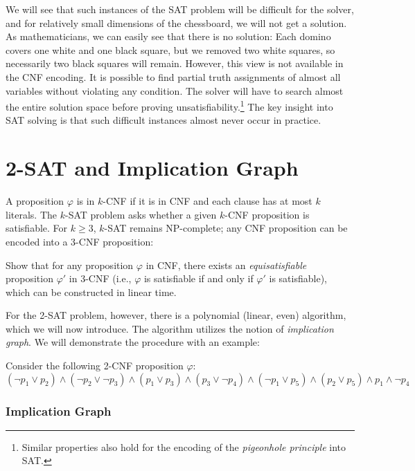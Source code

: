 We will see that such instances of the SAT problem will be difficult for the solver, and for relatively small dimensions of the chessboard, we will not get a solution. As mathematicians, we can easily see that there is no solution: Each domino covers one white and one black square, but we removed two white squares, so necessarily two black squares will remain. However, this view is not available in the CNF encoding. It is possible to find partial truth assignments of almost all variables without violating any condition. The solver will have to search almost the entire solution space before proving unsatisfiability.\footnote{Similar properties also hold for the encoding of the \emph{pigeonhole principle} into SAT.} The key insight into SAT solving is that such difficult instances almost never occur in practice.


\section{2-SAT and Implication Graph}

A proposition $\varphi$ is in $k$-CNF if it is in CNF and each clause has at most $k$ literals. The $k$-SAT problem asks whether a given $k$-CNF proposition is satisfiable. For $k \geq 3$, $k$-SAT remains NP-complete; any CNF proposition can be encoded into a 3-CNF proposition:

\begin{exercise}
Show that for any proposition $\varphi$ in CNF, there exists an \emph{equisatisfiable} proposition $\varphi'$ in 3-CNF (i.e., $\varphi$ is satisfiable if and only if $\varphi'$ is satisfiable), which can be constructed in linear time.
\end{exercise}

For the 2-SAT problem, however, there is a polynomial (linear, even) algorithm, which we will now introduce. The algorithm utilizes the notion of \emph{implication graph}. We will demonstrate the procedure with an example:
\begin{example}
    Consider the following 2-CNF proposition $\varphi$:
    $$
    (\neg p_1 \lor p_2) \land (\neg p_2 \lor \neg p_3) \land (p_1\lor p_3) \land (p_3\lor \neg p_4)\land (\neg p_1\lor p_5)\land (p_2\lor p_5)\land p_1\land \neg p_4
    $$
\end{example}

\subsubsection{Implication Graph}

